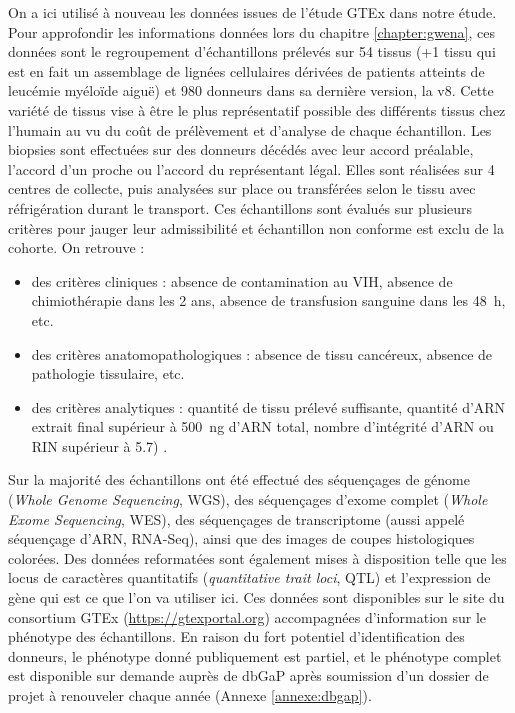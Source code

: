 On a ici utilisé à nouveau les données issues de l'étude GTEx  dans notre étude. Pour approfondir les informations données lors du chapitre \ref{chapter:gwena}, ces données sont le regroupement d'échantillons prélevés sur 54 tissus (+1 tissu qui est en fait un assemblage de lignées cellulaires dérivées de patients atteints de leucémie myéloïde aiguë) et 980 donneurs dans sa dernière version, la v8. Cette variété de tissus vise à être le plus représentatif possible des différents tissus chez l'humain au vu du coût de prélèvement et d'analyse de chaque échantillon. Les biopsies sont effectuées sur des donneurs décédés avec leur accord préalable, l'accord d'un proche ou l'accord du représentant légal. Elles sont réalisées sur 4 centres de collecte, puis analysées sur place ou transférées selon le tissu avec réfrigération durant le transport. Ces échantillons sont évalués sur plusieurs critères pour jauger leur admissibilité et échantillon non conforme est exclu de la cohorte. On retrouve : 
\begin{itemize}
    \item des critères cliniques : absence de contamination au VIH, absence de chimiothérapie dans les 2 ans, absence de transfusion sanguine dans les 48 h, etc.
    \item des critères anatomopathologiques : absence de tissu cancéreux, absence de pathologie tissulaire, etc.
    \item des critères analytiques : quantité de tissu prélevé suffisante, quantité d'ARN extrait final supérieur à 500 ng d'ARN total, nombre d'intégrité d'ARN ou RIN supérieur à 5.7) . 
\end{itemize}

Sur la majorité des échantillons ont été effectué des séquençages de génome (\textit{Whole Genome Sequencing}, WGS), des séquençages d'exome complet (\textit{Whole Exome Sequencing}, WES), des séquençages de transcriptome (aussi appelé séquençage d'ARN, RNA-Seq), ainsi que des images de coupes histologiques colorées. Des données reformatées sont également mises à disposition telle que les locus de caractères quantitatifs (\textit{quantitative trait loci}, QTL) et l'expression de gène qui est ce que l'on va utiliser ici. Ces données sont disponibles sur le site du consortium GTEx (\url{https://gtexportal.org}) accompagnées d'information sur le phénotype des échantillons. En raison du fort potentiel d'identification des donneurs, le phénotype donné publiquement est partiel, et le phénotype complet est disponible sur demande auprès de dbGaP après soumission d'un dossier de projet à renouveler chaque année (Annexe \ref{annexe:dbgap}).


